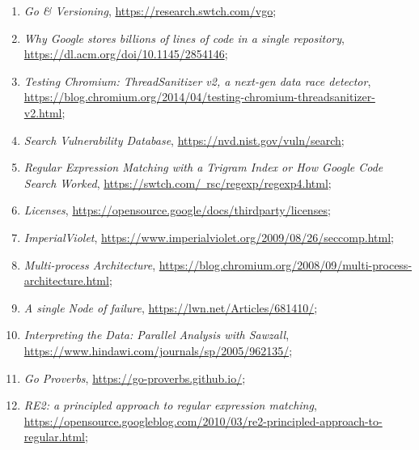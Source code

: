 \documentclass[a4paper,11pt]{article}
\begin{document}
\begin{enumerate}
\item \emph{Go \& Versioning},
  \href{https://research.swtch.com/vgo}{https://research.swtch.com/vgo};

\item \emph{Why Google stores billions of lines of code in a single
    repository},
  \href{https://dl.acm.org/doi/10.1145/2854146}{https://dl.acm.org/doi/10.1145/2854146};

\item \emph{Testing Chromium: ThreadSanitizer v2, a next-gen data race
    detector},
  \href{https://blog.chromium.org/2014/04/testing-chromium-threadsanitizer-v2.html}{https://blog.chromium.org/2014/04/testing-chromium-threadsanitizer-v2.html};

\item \emph{Search Vulnerability Database},
  \href{https://nvd.nist.gov/vuln/search}{https://nvd.nist.gov/vuln/search};

\item \emph{Regular Expression Matching with a Trigram Index or How
    Google Code Search Worked},
  \href{https://swtch.com/~rsc/regexp/regexp4.html}{https://swtch.com/~rsc/regexp/regexp4.html};

\item \emph{Licenses},
  \href{https://opensource.google/docs/thirdparty/licenses}{https://opensource.google/docs/thirdparty/licenses};

\item \emph{ImperialViolet},
  \href{https://www.imperialviolet.org/2009/08/26/seccomp.html}{https://www.imperialviolet.org/2009/08/26/seccomp.html};

\item \emph{Multi-process Architecture},
  \href{https://blog.chromium.org/2008/09/multi-process-architecture.html}{https://blog.chromium.org/2008/09/multi-process-architecture.html};

\item \emph{A single Node of failure},
  \href{https://lwn.net/Articles/681410/}{https://lwn.net/Articles/681410/};

\item \emph{Interpreting the Data: Parallel Analysis with Sawzall},
  \href{https://www.hindawi.com/journals/sp/2005/962135/}{https://www.hindawi.com/journals/sp/2005/962135/};

\item \emph{Go Proverbs},
  \href{https://go-proverbs.github.io/}{https://go-proverbs.github.io/};

\item \emph{RE2: a principled approach to regular expression
    matching},
  \href{https://opensource.googleblog.com/2010/03/re2-principled-approach-to-regular.html}{https://opensource.googleblog.com/2010/03/re2-principled-approach-to-regular.html};


\end{enumerate}
\end{document}
